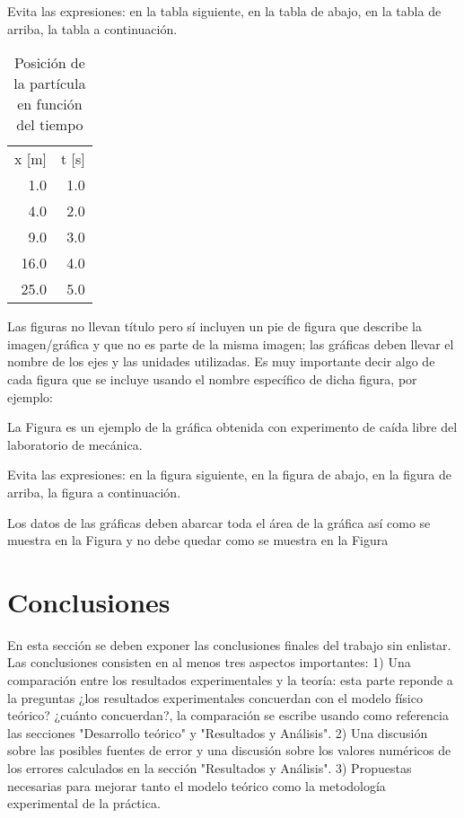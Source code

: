 \documentclass{article}
\begin{document}
\begin{multicols}{2}
Evita las expresiones: en la tabla siguiente, en la tabla de abajo, en la tabla de arriba, la tabla a continuación.
%
\begin{table}[H]
	\centering
	\begin{tabular}{ | r | r | }
	\hline
		x [m]		&	t [s] 			\\%
		1.0		&	1.0			\\
		4.0		&	2.0			\\
		9.0		&	3.0			\\
		16.0		&	4.0			\\
		25.0		&	5.0			\\
	\hline
	\end{tabular}
	\caption{Posici\'on de la partícula en funci\'on del tiempo}
	\label{Tabla:1}
\end{table}

Las figuras no llevan título pero sí incluyen un pie de figura que describe la imagen/gráfica y que no es parte de la misma imagen; las gr\'aficas deben llevar el nombre de los ejes y las unidades utilizadas. Es muy importante decir algo de cada figura que se incluye usando el nombre específico de dicha figura, por ejemplo: 

La Figura es un ejemplo de la gráfica obtenida con experimento de caída libre del laboratorio de mecánica. 

Evita las expresiones: en la figura siguiente, en la figura de abajo, en la figura de arriba, la figura a continuación. 

Los datos de las gráficas deben abarcar toda el área de la gráfica así como se muestra en la Figura y no debe quedar como se muestra en la Figura 





\section*{Conclusiones}\label{Conclusiones}				%

En esta sección se deben exponer las conclusiones finales del trabajo sin enlistar. Las conclusiones consisten en al menos tres aspectos importantes: 1) Una comparación entre los resultados experimentales y la teoría: esta parte reponde a la preguntas ¿los resultados experimentales concuerdan con el modelo físico teórico? ¿cuánto concuerdan?, la comparación se escribe usando como referencia las secciones "Desarrollo teórico" y "Resultados y Análisis". 2) Una discusión sobre las posibles fuentes de error y una discusión sobre los valores numéricos de los errores calculados en la sección "Resultados y Análisis". 3) Propuestas necesarias para mejorar tanto el modelo teórico como la metodología experimental de la práctica.


\end{multicols}
\end{document}
